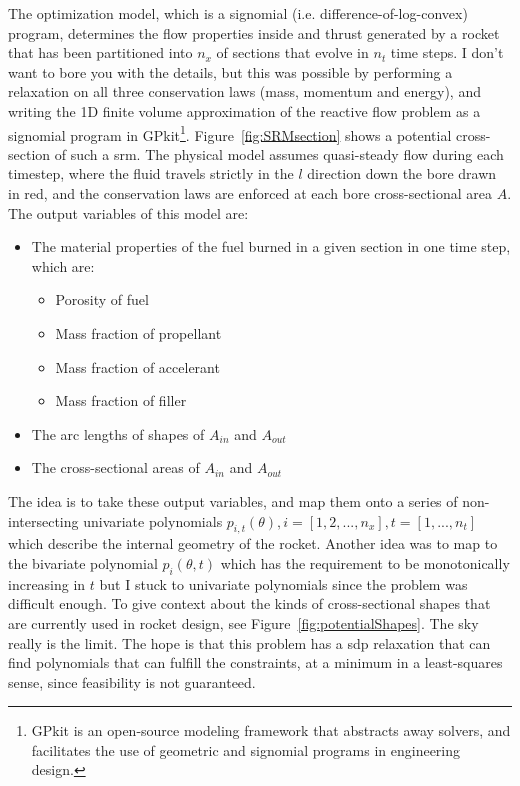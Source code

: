 The optimization model, which is a signomial (i.e. difference-of-log-convex) program, determines the
flow properties inside and thrust generated by a rocket that has
been partitioned into $n_x$ of sections that evolve in $n_t$ time steps.
I don't want to bore you with the details, but this was possible by performing a
relaxation on all three conservation laws (mass, momentum and energy),
and writing the 1D finite volume approximation of the reactive flow problem
as a signomial program in GPkit\footnote{GPkit is an open-source modeling framework
that abstracts away solvers, and facilitates the use of geometric and signomial programs in engineering design.}.
Figure~\ref{fig:SRMsection} shows a potential cross-section of such a \gls{srm}.
The physical model assumes quasi-steady flow during each timestep, where the fluid travels strictly
in the $l$ direction down the bore drawn in red, and the conservation laws are enforced at
each bore cross-sectional area $A$. The output variables of this model are:
\begin{itemize}
    \item The material properties of the fuel burned in a given section in one time step, which are:
    \begin{itemize}
        \item Porosity of fuel
        \item Mass fraction of propellant
        \item Mass fraction of accelerant
        \item Mass fraction of filler
    \end{itemize}
    \item The arc lengths of shapes of $A_{in}$ and $A_{out}$
    \item The cross-sectional areas of $A_{in}$ and $A_{out}$
\end{itemize}

The idea is to take these output variables, and map them onto a series of
non-intersecting univariate polynomials $p_{i,t}(\theta), i = [1,2,...,n_x], t = [1,...,n_t]$
which describe the internal geometry of the rocket.
Another idea was to map to the bivariate polynomial $p_i(\theta,t)$
which has the requirement to be monotonically increasing in $t$
but I stuck to univariate polynomials since the problem
was difficult enough.
To give context about the kinds of cross-sectional shapes that are currently used in rocket design,
see Figure~\ref{fig:potentialShapes}. The sky really is the limit.
The hope is that this problem has a \gls{sdp} relaxation that can find
polynomials that can fulfill the constraints, at a minimum in a least-squares sense,
since feasibility is not guaranteed.

